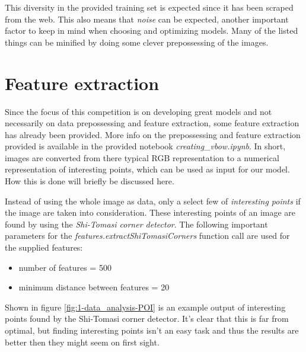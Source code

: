 This diversity in the provided training set is expected since it has been scraped from the web.
This also means that \emph{noise} can be expected, another important factor to keep in mind when choosing and optimizing models.
Many of the listed things can be minified by doing some clever prepossessing of the images.



\section{Feature extraction}
\label{section:DA_feature_extraction}

Since the focus of this competition is on developing great models and not necessarily on data prepossessing and feature extraction, some feature extraction has already been provided.
More info on the prepossessing and feature extraction provided is available in the provided notebook \emph{creating\_vbow.ipynb}.
In short, images are converted from there typical RGB representation to a numerical representation of interesting points, which can be used as input for our model.
How this is done will briefly be discussed here.

Instead of using the whole image as data, only a select few of \emph{interesting points} if the image are taken into consideration.
These interesting points of an image are found by using the \emph{Shi-Tomasi corner detector}.
The following important parameters for the \emph{features.extractShiTomasiCorners} function call are used for the supplied features:
\begin{itemize}
    \item number of features = 500
    \item minimum distance between features = 20
\end{itemize}

Shown in figure \ref{fig:1-data_analysis-POI} is an example output of interesting points found by the Shi-Tomasi corner detector.
It's clear that this is far from optimal, but finding interesting points isn't an easy task and thus the results are better then they might seem on first sight. 

